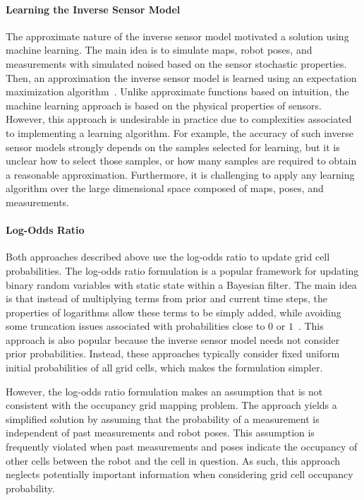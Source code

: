 \documentclass[thesis]{thesis-gwu}
\begin{document}
\paragraph{Learning the Inverse Sensor Model} The approximate nature of the inverse sensor model motivated a solution using machine learning. The main idea is to simulate maps, robot poses, and measurements with simulated noised based on the sensor stochastic properties. Then, an approximation the inverse sensor model is learned using an expectation maximization algorithm~\cite{Thr01,ThrBurFox05}. Unlike approximate functions based on intuition, the machine learning approach is based on the physical properties of sensors. However, this approach is undesirable in practice due to complexities associated to implementing a learning algorithm. For example, the accuracy of such inverse sensor models strongly depends on the samples selected for learning, but it is unclear how to select those samples, or how many samples are required to obtain a reasonable approximation. Furthermore, it is challenging to apply any learning algorithm over the large dimensional space composed of maps, poses, and measurements.

\paragraph{Log-Odds Ratio} Both approaches described above use the log-odds ratio to update grid cell probabilities. The log-odds ratio formulation is a popular framework for updating binary random variables with static state within a Bayesian filter. The main idea is that instead of multiplying terms from prior and current time steps, the properties of logarithms allow these terms to be simply added, while avoiding some truncation issues associated with probabilities close to $0$ or $1$~\cite{ThrBurFox05}. This approach is also popular because the inverse sensor model needs not consider prior probabilities. Instead, these approaches typically consider fixed uniform initial probabilities of all grid cells, which makes the formulation simpler.

However, the log-odds ratio formulation makes an assumption that is not consistent with the occupancy grid mapping problem. The approach yields a simplified solution by assuming that the probability of a measurement is independent of past measurements and robot poses. This assumption is frequently violated when past measurements and poses indicate the occupancy of other cells between the robot and the cell in question. As such, this approach neglects potentially important information when considering grid cell occupancy probability.
\end{document}
